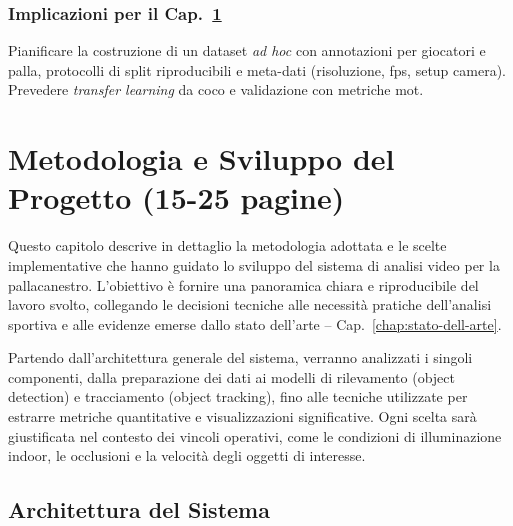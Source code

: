 \documentclass[12pt,a4paper,openright,twoside]{book}
\begin{document}
\subsection*{Implicazioni per il Cap.~\ref{chap:metodologia-sviluppo}}
Pianificare la costruzione di un dataset \emph{ad hoc} 
con annotazioni per giocatori e palla, protocolli di 
split riproducibili e meta-dati (risoluzione, \ac{fps}, 
setup camera). Prevedere \emph{transfer learning} da 
\ac{coco} e validazione con metriche \ac{mot}.

\chapter{Metodologia e Sviluppo del Progetto (15-25 pagine)}
\label{chap:metodologia-sviluppo}
Questo capitolo descrive in dettaglio la metodologia adottata 
e le scelte implementative che hanno guidato lo sviluppo 
del sistema di analisi video per la pallacanestro. 
L'obiettivo è fornire una panoramica chiara e riproducibile 
del lavoro svolto, collegando le decisioni tecniche alle 
necessità pratiche dell'analisi sportiva e alle evidenze emerse dallo 
stato dell'arte -- Cap.~\ref{chap:stato-dell-arte}.

Partendo dall'architettura generale del sistema, verranno 
analizzati i singoli componenti, dalla preparazione dei dati 
ai modelli di rilevamento (object detection) e tracciamento 
(object tracking), fino alle tecniche utilizzate per estrarre 
metriche quantitative e visualizzazioni significative.
Ogni scelta sarà giustificata nel contesto dei vincoli 
operativi, come le condizioni di illuminazione indoor, 
le occlusioni e la velocità degli oggetti di interesse.

\section{Architettura del Sistema}
\label{sec:architettura-sistema}
\end{document}

